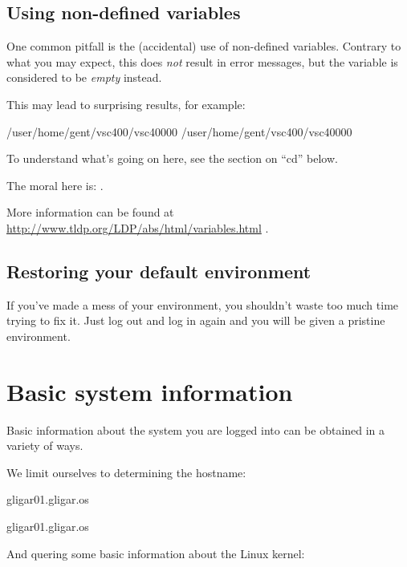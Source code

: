 \begin{prompt}
\end{prompt}

\subsection{Using non-defined variables}

One common pitfall is the (accidental) use of non-defined variables.  Contrary
to what you may expect, this does \emph{not} result in error messages, but the
variable is considered to be \emph{empty} instead.

This may lead to surprising results, for example:

\begin{prompt}
  /user/home/gent/vsc400/vsc40000
  /user/home/gent/vsc400/vsc40000
\end{prompt}

To understand what's going on here, see the section on ``cd'' below.

The moral here is: .

More information can be found at \url{http://www.tldp.org/LDP/abs/html/variables.html} .

\subsection{Restoring your default environment}

If you've made a mess of your environment, you shouldn't waste too much time
trying to fix it. Just log out and log in again and you will be given a
pristine environment.

\section{Basic system information}

Basic information about the system you are logged into can be obtained in a variety of ways.

We limit ourselves to determining the hostname:

\begin{prompt}
  gligar01.gligar.os

  gligar01.gligar.os
\end{prompt}

And quering some basic information about the Linux kernel:


